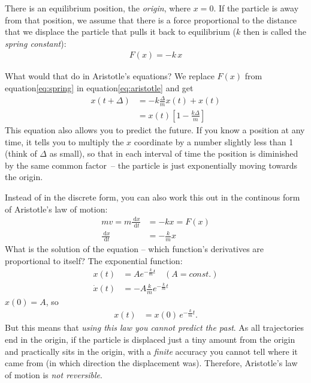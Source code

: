 \documentclass[pagesize,headsepline,10pt,parskip=half]{scrreprt}
\newcommand{\eq}{equation\xspace}
\renewcommand\d[1]{\:\textrm{d}#1}
\begin{document}
      There is an equilibrium position, the \emph{origin},
      where $x = 0$.
      If the particle is away from that position, we assume that there is a force proportional
      to the distance that we displace the particle that pulls it back to
      equilibrium ($k$ then is called the \emph{spring constant}):
      \begin{align}\label{eq:spring}
        F(x) = -k\,x
      \end{align}
      
      What would that do in Aristotle's equations?  We replace
      $F(x)$ from \eq \ref{eq:spring} in \eq \ref{eq:aristotle} and get
      \begin{align*}
        x(t + \Delta) &= -k \frac{\Delta}{m} x(t) + x(t) \\
        &= x(t) \left[1 - \frac{k\Delta}{m} \right]
      \end{align*}
      This equation also allows you to predict the future. If you know a
      position at any time, it tells you to multiply the $x$ coordinate by a
      number slightly less than 1 (think of $\Delta$ as small), so that in each
      interval of time the position is diminished by the same common factor\ --
      the particle is just exponentially moving towards the origin.
      
      Instead of in the discrete form, you can also work this out in the
      continous form of Aristotle's law of motion:
      \begin{align*}
        m v = m \frac{\d x}{\d t} &= -k x = F(x) \\
        \frac{\d x}{\d t} &= -\frac{k}{m} x
      \end{align*}
      What is the solution of the equation – which function’s derivatives are
      proportional to itself? The exponential function:
      \begin{align*}
        x(t) &= A e^{-\frac{k}{m} t} \quad(A = const.) \\
        \dot x(t) &= -A \frac{k}{m} e^{-\frac{k}{m} t}
      \end{align*}
      $x(0) = A$, so
      \begin{align*}
        x(t) &= x(0)\,e^{-\frac{k}{m} t}.
      \end{align*}
      But this means that \emph{using this law you cannot predict the past}.  As
      all trajectories end in the origin, if the particle is displaced just a tiny amount from
      the origin and practically sits in the origin, with a \emph{finite}
      accuracy you cannot tell where it came from (in which direction the
      displacement was).  Therefore, Aristotle's law of motion is \emph{not
      reversible}.
      
\end{document}
